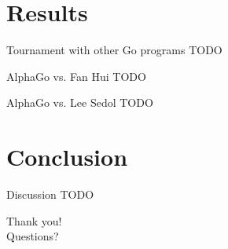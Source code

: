 \documentclass{beamer}
\newcommand{\todo}{\alert{TODO}}
\begin{document}

  \section{Results}

  \begin{frame}{Tournament with other Go programs}
    \todo
  \end{frame}

  \begin{frame}{AlphaGo vs. Fan Hui}
    \todo
  \end{frame}

  \begin{frame}{AlphaGo vs. Lee Sedol}
    \todo
  \end{frame}


  \section{Conclusion}

  \begin{frame}{Discussion}
    \todo
  \end{frame}

  \begin{frame}
    \begin{center}
      Thank you! \\
      Questions?
    \end{center}
  \end{frame}
\end{document}
